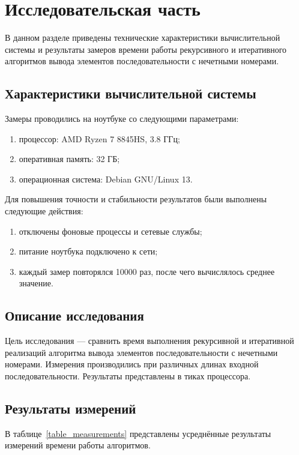 \chapter{Исследовательская часть}

В данном разделе приведены технические характеристики вычислительной системы и результаты замеров времени работы рекурсивного и итеративного алгоритмов вывода элементов последовательности с нечетными номерами.

\section{Характеристики вычислительной системы}

Замеры проводились на ноутбуке со следующими параметрами:
\begin{enumerate}
	\item процессор: AMD Ryzen 7 8845HS, 3.8 ГГц;
	\item оперативная память: 32 ГБ;
	\item операционная система: Debian GNU/Linux 13.
\end{enumerate}

Для повышения точности и стабильности результатов были выполнены следующие действия:
\begin{enumerate}
	\item отключены фоновые процессы и сетевые службы;
	\item питание ноутбука подключено к сети;
	\item каждый замер повторялся 10000 раз, после чего вычислялось среднее значение.
\end{enumerate}

\section{Описание исследования}

Цель исследования — сравнить время выполнения рекурсивной и итеративной реализаций алгоритма вывода элементов последовательности с нечетными номерами.  
Измерения производились при различных длинах входной последовательности.  
Результаты представлены в тиках процессора.

\section{Результаты измерений}

В таблице~\ref{table_measurements} представлены усреднённые результаты измерений времени работы алгоритмов.

